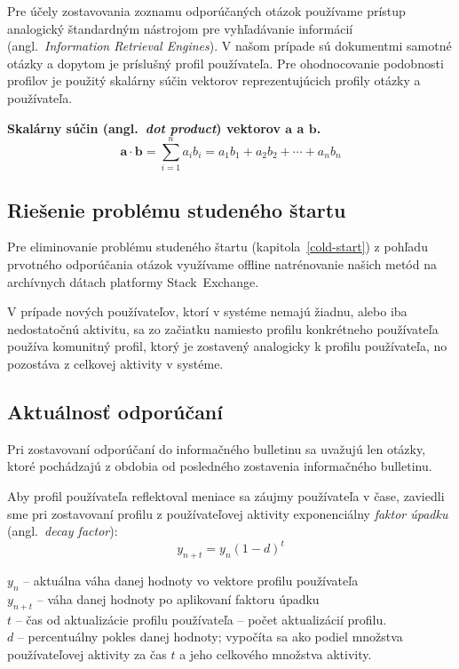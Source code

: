 Pre účely zostavovania zoznamu odporúčaných otázok používame prístup analogický štandardným nástrojom pre vyhľadávanie
informácií (angl.~\emph{Information Retrieval Engines}). V našom prípade sú dokumentmi samotné otázky a dopytom je
príslušný profil používateľa. Pre ohodnocovanie podobnosti profilov je použitý skalárny súčin vektorov reprezentujúcich
profily otázky a používateľa.

\textbf{Skalárny súčin (angl.~\textit{dot product}) vektorov $\mathbf{a}$ a $\mathbf{b}$.}\\
$$\mathbf{a}\cdot\mathbf{b}=\sum_{i=1}^n a_ib_i=a_1b_1+a_2b_2+\cdots+a_nb_n$$

\subsection{Riešenie problému studeného štartu}

Pre eliminovanie problému studeného štartu (kapitola~\ref{cold-start}) z pohľadu prvotného odporúčania otázok využívame
offline natrénovanie našich metód na archívnych dátach platformy Stack~Exchange.

V prípade nových používateľov, ktorí v systéme nemajú žiadnu, alebo iba nedostatočnú aktivitu, sa zo začiatku namiesto profilu
konkrétneho používateľa používa komunitný profil, ktorý je zostavený analogicky k profilu používateľa, no pozostáva
z celkovej aktivity v systéme.


\subsection{Aktuálnosť odporúčaní}
\label{design:freshness}
Pri zostavovaní odporúčaní do informačného bulletinu sa uvažujú len otázky, ktoré pochádzajú
z obdobia od posledného zostavenia informačného bulletinu.

Aby profil používateľa reflektoval meniace sa záujmy používateľa v čase, zaviedli sme pri zostavovaní profilu z používateľovej
aktivity exponenciálny \textit{faktor úpadku} (angl.~\textit{decay factor}):
$$y_{n+t} = y_n (1 - d)^t$$

\begin{adjustwidth}{1cm}{1cm}
$y_n$ -- aktuálna váha danej hodnoty vo vektore profilu používateľa\\
$y_{n+t}$ -- váha danej hodnoty po aplikovaní faktoru úpadku\\
$t$ -- čas od aktualizácie profilu používateľa -- počet aktualizácií profilu.\\
$d$ -- percentuálny pokles danej hodnoty; vypočíta sa ako podiel množstva používateľovej aktivity za čas $t$ a jeho celkového množstva aktivity.
\end{adjustwidth}

